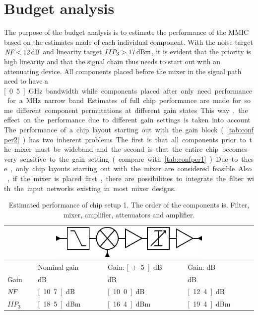 	\section{Budget analysis}\label{sec:budget_analysis}
		The purpose of the budget analysis is to estimate the performance of the MMIC based on the estimates made of each individual component. With the noise target $\nf<\unit[12]{dB}$ and linearity target $IIP_3>\unit[17]{dBm}$, it is evident that the priority is high linearity and that the signal chain thus needs to start out with an attenuating device. All components placed before the mixer in the signal path need to have a \unit[0.5]{GHz} bandwidth while components placed after only need performance for a \unit[20]{MHz} narrow band. Estimates of full chip performance are made for some different component permutations at different gain states. This way, the effect on the performance due to different gain settings is taken into account.

		The performance of a chip layout starting out with the gain block (\autoref{tab:confper2}) has two inherent problems. The first is that all components prior to the mixer must be wideband and the second is that the entire chip becomes very sensitive to the gain setting (compare with \autoref{tab:confper1}). Due to these, only chip layouts starting out with the mixer are considered feasible. Also, if the mixer is placed first, there are possibilities to integrate the filter with the input networks existing in most mixer designs.
		
		\begin{table}[hpt!]
			\caption[Estimated performance of chip setup 1.]{Estimated performance of chip setup 1. The order of the components is. Filter, mixer, amplifier, attenuators and amplifier.}
			\label{tab:confper1}
			\centering
			\begin{tabular}{ l l l l }
				\multicolumn{4}{c}{\includegraphics[width=0.6\textwidth]{fig/system/sys1}} \\\toprule
				& Nominal gain & Gain: \unit[+5]{dB} & Gain: \unit[-5]{dB} \\\midrule
				Gain & \unit[9]{dB} & \unit[14]{dB} & \unit[4]{dB} \\
				$\emph{NF}$ & \unit[10.7]{dB} & \unit[10.0]{dB} & \unit[12.4]{dB} \\
				$IIP_3$ & \unit[18.5]{dBm} & \unit[16.4]{dBm} & \unit[19.4]{dBm} \\\bottomrule
			\end{tabular}
		\end{table}

